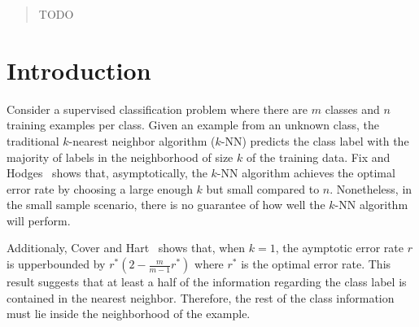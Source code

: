 \documentclass{article}
\begin{document}
 


\begin{abstract} 
TODO
\end{abstract} 

\section{Introduction}
\label{sec:intro}

Consider a supervised classification problem where there are $m$
classes and $n$ training examples per class. Given an example from an
unknown class, the traditional $k$-nearest neighbor algorithm ($k$-NN)
predicts the class label with the majority of labels in the
neighborhood of size $k$ of the training data. Fix and Hodges~\cite{}
shows that, asymptotically, the $k$-NN algorithm achieves the optimal
error rate by choosing a large enough $k$ but small compared to
$n$. Nonetheless, in the small sample scenario, there is no guarantee
of how well the $k$-NN algorithm will perform.

Additionaly, Cover and Hart~\cite{} shows that, when $k = 1$, the
aymptotic error rate $r$ is upperbounded by $r^*(2 -
\frac{m}{m-1}r^*)$ where $r^*$ is the optimal error rate. This result
suggests that at least a half of the information regarding the class
label is contained in the nearest neighbor. Therefore, the rest of the
class information must lie inside the neighborhood of the example. 
\end{document}
